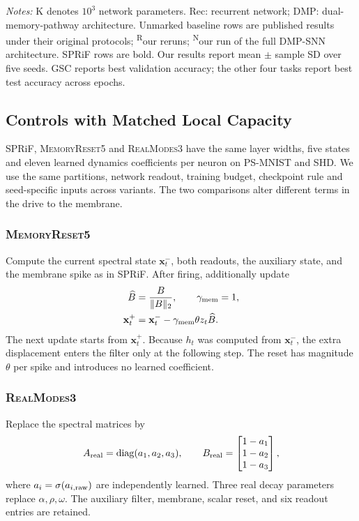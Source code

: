 \documentclass[letterpaper,journal]{IEEEtran}
\newcommand{\mr}{\textnormal{\textsc{MemoryReset5}}}
\newcommand{\rmodes}{\textnormal{\textsc{RealModes3}}}
\DeclareMathOperator{\diag}{diag}
\begin{document}
\begin{table}[!t]
\vspace{4pt}
\begin{minipage}{\textwidth}
\footnotesize
\textit{Notes:} K denotes $10^3$ network parameters. Rec: recurrent network; DMP: dual-memory-pathway architecture. Unmarked baseline rows are published results under their original protocols; \textsuperscript{R}our reruns; \textsuperscript{N}our run of the full DMP-SNN architecture. SPRiF rows are bold. Our results report mean $\pm$ sample SD over five seeds. GSC reports best validation accuracy; the other four tasks report best test accuracy across epochs.
\end{minipage}
\endgroup
\end{table}

\subsection{Controls with Matched Local Capacity}
\label{sec:controls}

SPRiF, \mr{} and \rmodes{} have the same layer widths, five states and eleven learned dynamics coefficients per neuron on PS-MNIST and SHD. We use the same partitions, network readout, training budget, checkpoint rule and seed-specific inputs across variants. The two comparisons alter different terms in the drive to the membrane.

\subsubsection{\mr}
Compute the current spectral state $\mathbf x_t^-$, both readouts, the auxiliary state, and the membrane spike as in SPRiF. After firing, additionally update
\begin{equation}
\begin{aligned}
\widehat B&=\frac{B}{\|B\|_2},\qquad \gamma_{\rm mem}=1,\\
\mathbf x_t^+&=\mathbf x_t^--\gamma_{\rm mem}\theta z_t\widehat B.
\end{aligned}
\label{eq:memory_reset_control}
\end{equation}
The next update starts from $\mathbf x_t^+$. Because $h_t$ was computed from $\mathbf x_t^-$, the extra displacement enters the filter only at the following step. The reset has magnitude $\theta$ per spike and introduces no learned coefficient.

\subsubsection{\rmodes}
Replace the spectral matrices by
\begin{equation}
A_{\rm real}=\diag(a_1,a_2,a_3),\qquad
B_{\rm real}=\begin{bmatrix}1-a_1\\1-a_2\\1-a_3\end{bmatrix},
\label{eq:real_control}
\end{equation}
where $a_i=\sigma(a_{i,\rm raw})$ are independently learned. Three real decay parameters replace $\alpha,\rho,\omega$. The auxiliary filter, membrane, scalar reset, and six readout entries are retained.
\end{document}
